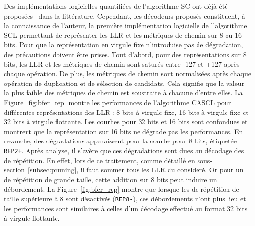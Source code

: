 Des implémentations logicielles quantifiées de l'algorithme SC ont déjà été proposées~\cite{giard_low-latency_2016} dans la littérature.
 Cependant, les décodeurs proposés constituent, à la connaissance de l'auteur, la première implémentation logicielle de l'algorithme SCL permettant de représenter les LLR et les métriques de chemin sur 8 ou 16 bits.
Pour que la représentation en virgule fixe n'introduise pas de dégradation, des précautions doivent être prises.
Tout d'abord, pour des représentations sur 8 bits, les LLR et les métriques de chemin sont saturés entre -127 et +127 après chaque opération.
De plus, les métriques de chemin sont normalisées après chaque opération de duplication et de sélection de candidats. Cela signifie que la valeur la plus faible des métriques de chemin est soustraite à chacune d'entre elles.
La Figure~\ref{fig:bfer_rep} montre les performances de l'algorithme CASCL pour différentes représentations des LLR : 8 bits à virgule fixe, 16 bits à virgule fixe et 32 bits à virgule flottante.
Les courbes pour 32 bits et 16 bits sont confondues et montrent que la représentation sur 16 bits ne dégrade pas les performances. En revanche, des dégradations apparaissent pour la courbe pour 8 bits, étiquetée \texttt{REP2+}.
Après analyse, il s'avère que ces dégradations sont dues au décodage des \noeuds de répétition.
En effet, lors de ce traitement, comme détaillé en sous-section~\ref{subsec:pruning}, il faut sommer tous les LLR du \noeud considéré.
Or pour un \noeud de répétition de grande taille, cette addition sur 8 bits peut induire un débordement.
La Figure~\ref{fig:bfer_rep} montre que lorsque les \noeuds de répétition de taille supérieure à 8 sont désactivés (\texttt{REP8-}), ces débordements n'ont plus lieu et les performances sont similaires à celles d'un décodage effectué au format 32 bits à virgule flottante.

